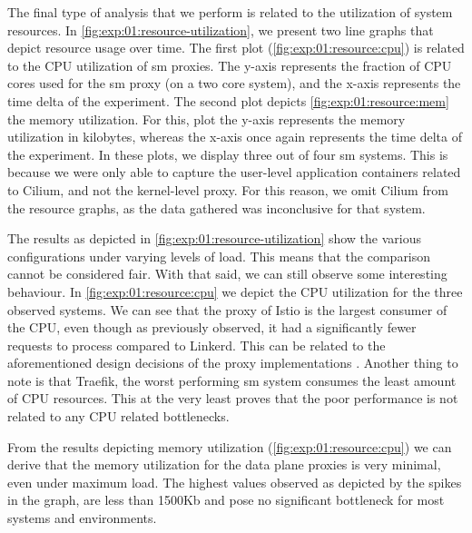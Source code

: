 The final type of analysis that we perform is related to the utilization of system resources. In \cref{fig:exp:01:resource-utilization}, we present two line graphs that depict resource usage over time. The first plot (\cref{fig:exp:01:resource:cpu}) is related to the CPU utilization of \gls{sm} proxies. The y-axis represents the fraction of CPU cores used for the \gls{sm} proxy (on a two core system), and the x-axis represents the time delta of the experiment. The second plot depicts \cref{fig:exp:01:resource:mem} the memory utilization. For this, plot the y-axis represents the memory utilization in kilobytes, whereas the x-axis once again represents the time delta of the experiment. In these plots, we display three out of four \gls{sm} systems. This is because we were only able to capture the user-level application containers related to Cilium, and not the kernel-level proxy. For this reason, we omit Cilium from the resource graphs, as the data gathered was inconclusive for that system.

The results as depicted in \cref{fig:exp:01:resource-utilization} show the various configurations under varying levels of load. This means that the comparison cannot be considered fair. With that said, we can still observe some interesting behaviour. In \cref{fig:exp:01:resource:cpu} we depict the CPU utilization for the three observed systems. We can see that the proxy of Istio is the largest consumer of the CPU, even though as previously observed, it had a significantly fewer requests to process compared to Linkerd. This can be related to the aforementioned design decisions of the proxy implementations \cite{linkerd-no-envoy}. Another thing to note is that Traefik, the worst performing \gls{sm} system consumes the least amount of CPU resources. This at the very least proves that the poor performance is not related to any CPU related bottlenecks.

From the results depicting memory utilization (\cref{fig:exp:01:resource:cpu}) we can derive that the memory utilization for the data plane proxies is very minimal, even under maximum load. The highest values observed as depicted by the spikes in the graph, are less than 1500Kb and pose no significant bottleneck for most systems and environments.

